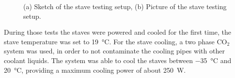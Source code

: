 \begin{figure}
	\centering
	\null\hfill
	\hfill\null
	\null\hfill
	\caption{(a) Sketch of the stave testing setup, (b) Picture of the stave testing setup.}
\end{figure}
During those tests the staves were powered and cooled for the first time, the stave temperature was set to \SI{19}{\celsius}. For the stave cooling, a two phase CO$_2$\cite{traci} system was used, in order to not contaminate the cooling pipes with other coolant liquids. The system was able to cool the staves between \SI{-35}{\celsius} and \SI{20}{\celsius}, providing a maximum cooling power of about \SI{250}{\watt}.
